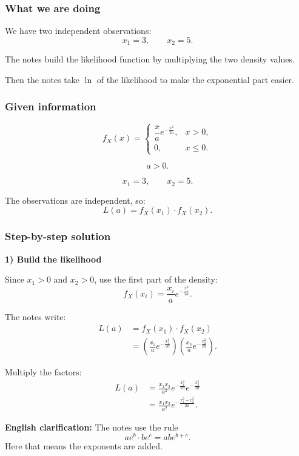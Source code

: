 \documentclass[10pt]{article}
\begin{document}
\subsubsection*{What we are doing}

We have two independent observations:
\[
x_1=3,
\qquad
x_2=5.
\]

The notes build the likelihood function by
multiplying the two density values.

Then the notes take \(\ln\) of the likelihood to make
the exponential part easier.

\subsubsection*{Given information}

\[
f_X(x)=
\begin{cases}
\dfrac{x}{a}
e^{-\frac{x^2}{2a}},
& x>0,\\
0,
& x\le 0.
\end{cases}
\]

\[
a>0.
\]

\[
x_1=3,
\qquad
x_2=5.
\]

The observations are independent, so:
\[
L(a)=f_X(x_1)\cdot f_X(x_2).
\]

\subsubsection*{Step-by-step solution}

\textbf{1) Build the likelihood}

Since \(x_1>0\) and \(x_2>0\), use the first part of
the density:
\[
f_X(x_i)
=
\frac{x_i}{a}
e^{-\frac{x_i^2}{2a}}.
\]

The notes write:
\begin{align*}
L(a)
&=
f_X(x_1)\cdot f_X(x_2)
\\[2mm]
&=
\left(
\frac{x_1}{a}
e^{-\frac{x_1^2}{2a}}
\right)
\left(
\frac{x_2}{a}
e^{-\frac{x_2^2}{2a}}
\right).
\end{align*}

Multiply the factors:
\begin{align*}
L(a)
&=
\frac{x_1x_2}{a^2}
e^{-\frac{x_1^2}{2a}}
e^{-\frac{x_2^2}{2a}}
\\[2mm]
&=
\frac{x_1x_2}{a^2}
e^{
-\frac{x_1^2+x_2^2}{2a}
}.
\end{align*}

\textbf{English clarification:}
The notes use the rule
\[
a e^b\cdot b e^c
=ab e^{b+c}.
\]
Here that means the exponents are added.
\end{document}
